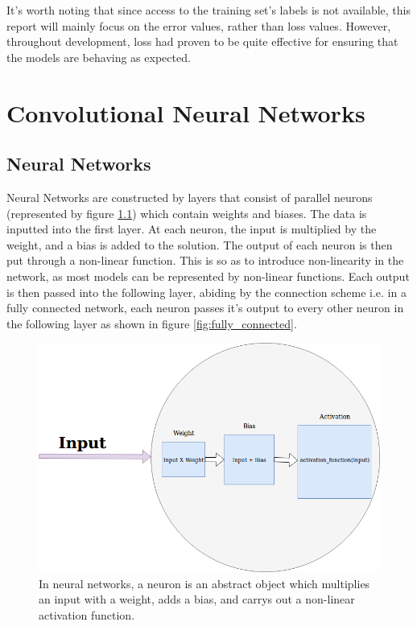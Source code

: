 \documentclass[12pt,a4paper,oneside,oldfontcommands]{memoir}
\begin{document}
\begin{Declaration Of OriginalityOrginality}
It's worth noting that since access to the training set's labels is not available, this report will mainly focus on the error values, rather than loss values. However, throughout development, loss had proven to be quite effective for ensuring that the models are behaving as expected.

\chapter{Convolutional Neural Networks}

\section{Neural Networks}
Neural Networks are constructed by layers that consist of parallel neurons (represented by figure \ref{fig:neuron}) which contain weights and biases. The data is inputted into the first layer. At each neuron, the input is multiplied by the weight, and a bias is added to the solution. The output of each neuron is then put through a non-linear function. This is so as to introduce non-linearity in the network, as most models can be represented by non-linear functions. Each output is then passed into the following layer, abiding by the connection scheme i.e. in a fully connected network, each neuron passes it's output to every other neuron in the following layer as shown in figure \ref{fig:fully_connected}. 

    \begin{figure}[ht]
    \center
      \includegraphics[width=12cm]{images/neuron.png}
      \caption{In neural networks, a neuron is an abstract object which multiplies an input with a weight, adds a bias, and carrys out a non-linear activation function.}
      \label{fig:neuron}
    \end{figure}
    

\end{Declaration Of OriginalityOrginality}
\end{document}
